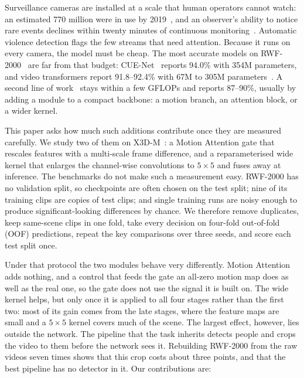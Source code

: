 \documentclass[runningheads]{llncs}
\begin{document}
Surveillance cameras are installed at a scale that human operators cannot
watch: an estimated 770 million were in use by 2019~\cite{cnbc2019}, and an
observer's ability to notice rare events declines within twenty minutes of
continuous monitoring~\cite{mackworth1948}. Automatic violence detection
flags the few streams that need attention. Because it runs on every camera,
the model must be cheap. The most accurate models on
RWF-2000~\cite{rwf2000} are far from that budget: CUE-Net~\cite{cuenet}
reports 94.0\% with 354M parameters, and video transformers report
91.8--92.4\% with 67M to 305M parameters~\cite{videomae,mixvit}. A second
line of work~\cite{rwf2000,sepconvlstm,mdcn,biltma} stays within a few
GFLOPs and reports 87--90\%, usually by adding a module to a compact
backbone: a motion branch, an attention block, or a wider kernel.

This paper asks how much such additions contribute once they are measured
carefully. We study two of them on X3D-M~\cite{x3d}: a Motion Attention
gate that rescales features with a multi-scale frame difference, and a
reparameterised wide kernel that enlarges the channel-wise convolutions to
$5\times5$ and fuses away at inference. The benchmarks do not make such a
measurement easy. RWF-2000 has no validation split, so checkpoints are
often chosen on the test split; nine of its training clips are copies of
test clips; and single training runs are noisy enough to produce
significant-looking differences by chance. We therefore remove duplicates,
keep same-scene clips in one fold, take every decision on four-fold
out-of-fold (OOF) predictions, repeat the key comparisons over three seeds,
and score each test split once.

Under that protocol the two modules behave very differently. Motion
Attention adds nothing, and a control that feeds the gate an all-zero
motion map does as well as the real one, so the gate does not use the
signal it is built on. The wide kernel helps, but only once it is applied
to all four stages rather than the first two: most of its gain comes from
the late stages, where the feature maps are small and a $5\times5$ kernel
covers much of the scene. The largest effect, however, lies outside the
network. The pipeline that the task inherits detects people and crops the
video to them before the network sees it. Rebuilding RWF-2000 from the raw
videos seven times shows that this crop costs about three points, and that
the best pipeline has no detector in it. Our contributions are:
\end{document}
